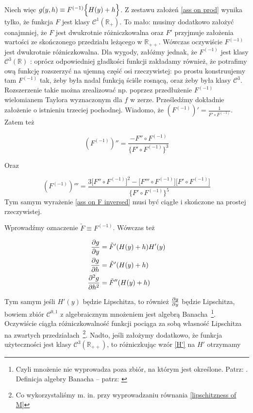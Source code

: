 Niech więc $ g(y,h) \equiv F^{(-1)} \Bigl \{ H(y) + h \Bigl \}$. Z zestawu założeń \ref{ass on prod} wynika tylko, że funkcja $ F $ jest klasy $ \mathcal{C}^{1}(\mathbb{R}_{+})$. To mało: musimy dodatkowo założyć conajmniej, że $ F $ jest dwukrotnie różniczkowalna oraz $ F' $ przyjmuje założenia wartości ze skończonego przedziału leżącego w $ \mathbb{R}_{++} $. Wówczas oczywiście $ F^{(-1)} $ jest dwukrotnie różniczkowalna. Dla wygody, załóżmy jednak, że $ F^{(-1)} $ jest klasy $ \mathcal{C}^{3}(\mathbb{R}) $ : oprócz odpowiedniej gładkości funkcji zakładamy również, że potrafimy ową funkcję rozszerzyć na ujemną część osi rzeczywistej: po prostu konstruujemy tam $ F^{(-1)} $ tak, żeby była nadal funkcją ściśle rosnącą, oraz żeby była klasy $ \mathcal{C}^{3}$. Rozszerzenie takie można zrealizować np. poprzez przedłużenie $ F^{(-1)} $ wielomianem Taylora wyznaczonym dla $ f $ w zerze. Prześledźmy dokładnie założenie o istnieniu trzeciej pochodnej. Wiadomo, że $ (F^{(-1)})' = \frac{1}{F' \circ F^{(-1)}} $. Zatem też

$$ (F^{(-1)})'' = \frac{-F''\circ F^{(-1)}}{\Big\{ F' \circ F^{(-1)}\Big\}^{3}}  $$ 

Oraz

\begin{equation}\label{ass on F inversed}
(F^{(-1)})''' = \frac{3 \Big[ F'' \circ F^{(-1)}\Big]^2 - \Big[ F''' \circ F^{(-1)} \Big] \Big[ F' \circ 	F^{(-1)}\Big] }{\Big\{ F' \circ F^{(-1)}\Big\}^5} 
\end{equation}
Tym samym wyrażenie \ref{ass on F inversed} musi być ciągłe i skończone na prostej rzeczywistej.

Wprowadźmy oznaczenie $ \tilde{F} \equiv F^{(-1)}$. Wówczas też

\begin{equation*}
\begin{split}
\frac{\partial g}{\partial y} &= \tilde{F}'(H(y)+h)H'(y) \\
\frac{\partial g}{\partial h} &= \tilde{F}'(H(y)+h)  	\\
\frac{\partial^{2} g }{\partial h^2} &= \tilde{F}''(H(y)+h) \\
\end{split}
\end{equation*}

Tym samym jeśli $ H'(y) $ będzie Lipschitza, to również $ \frac{\partial g}{\partial y} $ będzie Lipschitza, bowiem zbiór $ \mathcal{C}^{0,1} $ z algebraicznym mnożeniem jest algebrą Banacha~\footnote{Czyli mnożenie nie wyprowadza poza zbiór, na którym jest określone. Patrz: \citet{Goebel}. Definicja algebry Banacha -- patrz: \citet[][str. 263]{Rudin}}. Oczywiście ciągła różniczkowalność funkcji pociąga za sobą własność Lipschitza na zwartych przedziałach~\footnote{Co wykorzystaliśmy m. in. przy wyprowadzaniu równania \ref{lipschitzness of M}}. Nadto, jeśli założymy dodatkowo, że funkcja użyteczności jest klasy $ \mathcal{C}^{3}(\mathbb{R}_{++}) $, to różniczkując wzór \ref{H'} na $ H' $ otrzymamy

